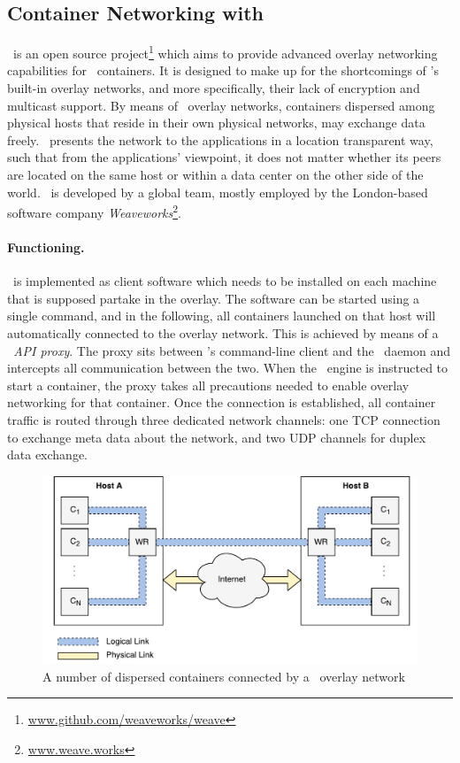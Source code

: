 
\subsection{Container Networking with \wnet}

\wnet\ is an open source project\footnote{\url{www.github.com/weaveworks/weave}} which aims to provide advanced overlay networking capabilities for \docker\ containers. It is designed to make up for the shortcomings of \docker 's built-in overlay networks, and more specifically, their lack of encryption and multicast support. By means of \docker\ overlay networks, containers dispersed among physical hosts that reside in their own physical networks, may exchange data freely. \wnet\ presents the network to the applications in a location transparent way, such that from the applications' viewpoint, it does not matter whether its peers are located on the same host or within a data center on the other side of the world. \wnet\ is developed by a global team, mostly employed by the London-based software company \emph{Weaveworks}\footnote{\url{www.weave.works}}.


\paragraph{Functioning.}
\wnet\ is implemented as client software which needs to be installed on each machine that is supposed partake in the overlay. The software can be started using a single command, and in the following, all containers launched on that host will automatically connected to the overlay network. This is achieved by means of a \emph{\docker\ API proxy}. The proxy sits between \docker 's command-line client and the \docker\ daemon and intercepts all communication between the two. When the \docker\ engine is instructed to start a container, the proxy takes all precautions needed to enable overlay networking for that container. Once the connection is established, all container traffic is routed through three dedicated network channels: one TCP connection to exchange meta data about the network, and two UDP channels for duplex data exchange.


\begin{figure}[htpb]
  \centering
  \includegraphics[width=\textwidth]{figures/sdn.pdf}
  \caption[An example of containers connected via \wnet\ overlay network]{A number of dispersed containers connected by a \wnet\ overlay network}\label{fig:weavescheme} 
\end{figure}

